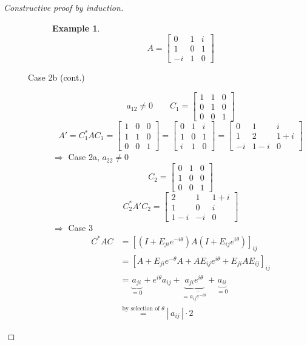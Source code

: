 \documentclass[a4paper,landscape,twocolumn]{article}
\newcommand\abs[1]{|\,#1\,|}
\theoremstyle{definition}
\newtheorem{ex}{Example}
\begin{document}
\begin{proof}[Constructive proof by induction]
\begin{description}
\begin{description}
          \begin{ex}
            \label{example-8.25}
            \[
              A = \begin{bmatrix}
                0 & 1 & i \\
                1 & 0 & 1 \\
                -i & 1 & 0
              \end{bmatrix}
            \]
          \end{ex}
        \item[Case 2b (cont.)]
          \[ a_{12} \neq 0 \qquad C_1 = \begin{bmatrix} 1 & 1 & 0 \\ 0 & 1 & 0 \\ 0 & 0 & 1 \end{bmatrix} \]
          \[
            A' = C_1^* A C_1 =
            \begin{bmatrix} 1 & 0 & 0 \\ 1 & 1 & 0 \\ 0 & 0 & 1 \end{bmatrix}
            = \begin{bmatrix} 0 & 1 & i \\ 1 & 0 & 1 \\ i & 1 & 0 \end{bmatrix}
            = \begin{bmatrix} 0 & 1 & i \\ 1 & 2 & 1+i \\ -i & 1-i & 0 \end{bmatrix}
          \]
          $\Rightarrow$ Case 2a, $a_{22} \neq 0$
          \[ C_2 = \begin{bmatrix} 0 & 1 & 0 \\ 1 & 0 & 0 \\ 0 & 0 & 1 \end{bmatrix} \]
          \[ C_2^* A' C_2 = \begin{bmatrix} 2 & 1 & 1+i \\ 1 & 0 & i \\ 1-i & -i & 0 \end{bmatrix} \]
          $\Rightarrow$ Case 3
          \begin{align*}
            C^* A C
              &= \left[\left(I + E_{ji} e^{-i\theta}\right) A \left(I + E_{ij} e^{i\theta}\right)\right]_{ij} \\
              &= \left[A + E_{ji} e^{-\theta} A + A E_{ij} e^{i\theta} + E_{ji} A E_{ij}\right]_{ij} \\
              &= \underbrace{a_{ji}}_{=0} + e^{i\theta} a_{ij} + \underbrace{a_{ji} e^{i\theta}}_{= \overline{a_{ij} e^{-i\theta}}} + \underbrace{a_{ii}}_{=0} \\
              &\overset{\text{by selection of } \theta}{=} \abs{a_{ij}} \cdot 2
          \end{align*}


\end{description}
\end{description}
\end{proof}
\end{document}
